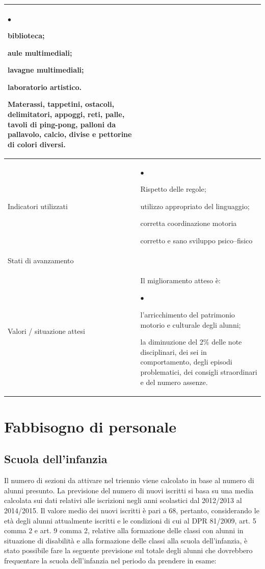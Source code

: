 \documentclass[12pt,a4paper,oneside]{memoir}
\newenvironment{elenco}{\begin{list}{$\bullet$}{%
              \setlength{\leftmargin}{4mm}%
              \setlength{\rightmargin}{1mm}%
               \setlength{\itemindent}{0mm}%
               \setlength{\labelwidth}{2mm}%
               \setlength{\labelsep}{2mm}%
              \setlength{\itemsep}{-\parsep}%
              \setlength{\partopsep}{0pt}%
              \setlength{\topsep}{0pt}%
             \setlength{\parskip}{0pt}%
              }}{\end{list}}
\begin{document}
\begin{footnotesize}
\begin{longtable}{|>{\raggedright}p{2.5cm}|>{\raggedright\arraybackslash}P{10cm}|}
\begin{elenco}
\item biblioteca;
\item aule multimediali;
\item lavagne multimediali;
\item laboratorio artistico.
\item Materassi, tappetini, ostacoli, delimitatori, appoggi, reti, palle, tavoli di ping-pong, palloni da pallavolo, calcio, divise e pettorine di colori diversi.
\end{elenco}\\[-4mm] \hline
Indicatori utilizzati&\begin{elenco}
\item Rispetto delle regole;
\item utilizzo appropriato del linguaggio;
\item corretta coordinazione motoria
\item corretto e sano sviluppo psico–fisico
\end{elenco}\\[-4mm] \hline
Stati di avanzamento&\\ \hline
Valori / situazione attesi&Il miglioramento atteso è:
\begin{elenco}
\item l'arricchimento del patrimonio motorio e culturale degli alunni;
\item la diminuzione del 2\% delle note disciplinari, dei sei in comportamento, degli episodi problematici, dei consigli straordinari e del numero assenze.
\end{elenco}\\ \hline
\end{longtable}
\end{footnotesize}

\chapter[Fabbisogno di personale]{Fabbisogno di personale}
\section[Scuola dell'infanzia]{Scuola dell'infanzia}
Il numero di sezioni da attivare nel triennio viene calcolato in base al numero di alunni presunto. La previsione del numero di nuovi iscritti si basa su una media calcolata sui dati relativi alle iscrizioni negli anni scolastici dal 2012/2013 al 2014/2015. Il valore medio dei nuovi iscritti è pari a 68, pertanto, considerando le età degli alunni attualmente iscritti e le condizioni di cui al DPR 81/2009, art. 5 comma 2 e art. 9 comma 2, relative alla formazione delle classi con alunni in situazione di disabilità e alla formazione delle classi alla scuola dell’infanzia, è stato possibile fare la seguente previsione sul totale degli alunni che dovrebbero frequentare la scuola dell’infanzia nel periodo da prendere in esame:
\end{document}
